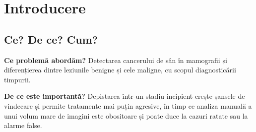 \documentclass[runningheads,a4paper,11pt]{report}
\begin{document}
\begin{abstract}
Cancerul de sân se numără printre cele mai frecvente tipuri de cancer la femei, iar depistarea timpurie crește semnificativ șansele de vindecare. Interpretarea mamografiilor este însă dificilă: variațiile densității țesutului, structurile suprapuse și diferențele subtile dintre leziunile benigne și cele maligne fac ca examinarea manuală să consume timp și să fie predispusă la erori.

Proiectul \emph{Pink Lens} propune un sistem inteligent care acționează ca un ,,al doilea set de ochi'' pentru radiolog: primește o mamografie și estimează cât de probabil este ca aceasta să conțină o leziune malignă. Metodele luate în considerare sunt modele de învățare profundă (rețele convoluționale, Vision Transformers, rețele neuronale pe grafuri), pre-antrenate pe seturi mari de imagini și apoi adaptate pe mamografii (transfer learning).

Această primă iterație cuprinde descrierea problemei (plastică și formală), analiza lucrărilor relevante din literatură și descrierea funcționalităților prototipului realizat în Streamlit, care permite încărcarea unei imagini DICOM, vizualizarea ei și rularea unei clasificări experimentale. Rezultatele experimentale vor fi prezentate în iterațiile următoare.
\end{abstract}


\tableofcontents

\newpage

\listoftables

\newpage


\newpage



\chapter{Introducere}
\label{chapter:introduction}

\section{Ce? De ce? Cum?}
\label{section:what}

\textbf{Ce problemă abordăm?} Detectarea cancerului de sân în mamografii și diferențierea dintre leziunile benigne și cele maligne, cu scopul diagnosticării timpurii.

\textbf{De ce este importantă?} Depistarea într-un stadiu incipient crește șansele de vindecare și permite tratamente mai puțin agresive, în timp ce analiza manuală a unui volum mare de imagini este obositoare și poate duce la cazuri ratate sau la alarme false.
\end{document}
